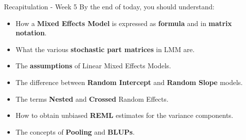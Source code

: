 \documentclass{beamer}
\begin{document}
\begin{frame}{Recapitulation - Week 5}
\large
By the end of today, you should understand:
\begin{itemize}
  \item How a \textbf{Mixed Effects Model} is expressed as \textbf{formula} and in \textbf{matrix notation}.
  \item What the various \textbf{stochastic part matrices} in LMM are.
  \item The \textbf{assumptions} of Linear Mixed Effects Models.
  \item The difference between \textbf{Random Intercept} and \textbf{Random Slope} models.
  \item The terms \textbf{Nested} and \textbf{Crossed} Random Effects.
  \item How to obtain unbiased \textbf{REML} estimates for the variance components.
  \item The concepts of \textbf{Pooling} and \textbf{BLUPs}.
\end{itemize}
\end{frame}
\end{document}
